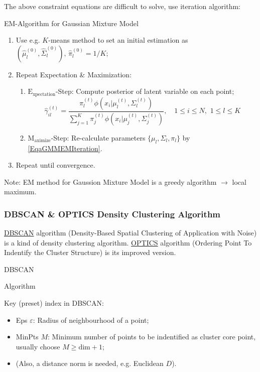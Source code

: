     The above constraint equations are difficult to solve, use iteration algorithm:
\begin{algorithm}{EM-Algorithm for Gaussian Mixture Model}
    \begin{enumerate}[topsep=2pt,itemsep=2pt]
        \item Use e.g. $ K $-means method to set an initial estimation as $ (\hat{\mu}^{(0)}_l,\hat{\Sigma }_l^{(0)}),\,\hat{\pi}_l^{(0)}=1/K$;
        \item Repeat Expectation \& Maximization:
        \begin{enumerate}[topsep=2pt,itemsep=2pt]
            \item $ \mathrm{E_{xpectation}} $-Step: Compute posterior of latent variable on each point;
        \begin{equation}
            \hat{\gamma }_{il}^{(t)}=\dfrac{\pi_l^{(t)}\phi(x_i|\mu _l^{(t)},\Sigma _l^{(t)})}{\sum\limits_{j=1}^K\pi_j^{(t)}\phi (x_i|\mu _j^{(t)},\Sigma _j^{(t)})} ,\quad  1\leq i\leq N,\,\, 1\leq l\leq K
        \end{equation}
        \item $ \mathrm{M_{aximize}} $-Step: Re-calculate parameters $ \{\mu_l,\Sigma _l,\pi_l\} $ by \autoref{EqaGMMEMIteration}.
        \end{enumerate}
        \item Repeat until convergence.
    \end{enumerate}
\end{algorithm}
    
    Note: EM method for Gaussion Mixture Model is a greedy algorithm $ \longrightarrow $ local maximum.
    
\subsubsection{DBSCAN \& OPTICS Density Clustering Algorithm}
    \hyperlink{DBSCAN}{DBSCAN} algorithm (Density-Based Spatial Clustering of Application with Noise) is a kind of density clustering algorithm. \hyperlink{OPTICS}{OPTICS} algorithm (Ordering Point To Indentify the Cluster Structure) is its improved version.


\begin{point}
    \hypertarget{DBSCAN}{DBSCAN} Algorithm
\end{point}

    Key (preset) index in DBSCAN:
    \begin{itemize}[topsep=2pt,itemsep=2pt]
        \item Eps $ \varepsilon  $: Radius of neighbourhood of a point;
        \item MinPts $ M $: Minimum number of points to be indentified as cluster core point, usually choose $ M\geq \mathrm{dim}+1 $;
        \item (Also, a distance norm is needed, e.g. Euclidean $ D $).
    \end{itemize}
    
